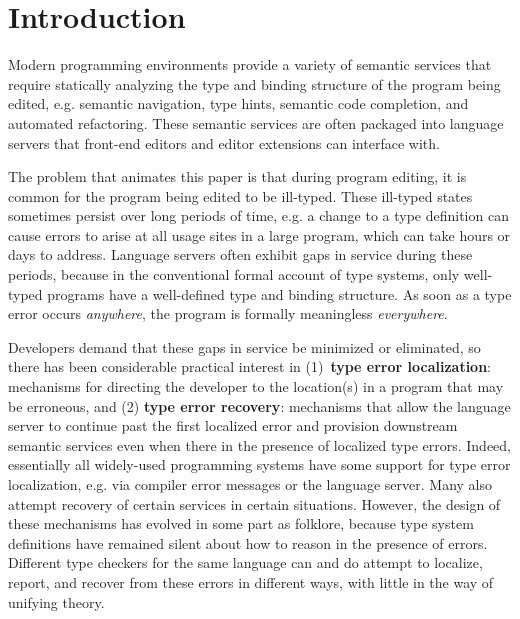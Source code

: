 \section{Introduction}
\label{sec:introduction}


Modern programming environments provide 
a variety of semantic services that require statically analyzing the type and binding structure of the program being edited, e.g. semantic navigation, type hints, semantic code completion, and automated refactoring. 
These semantic services are often packaged into language servers that front-end
editors and editor extensions can interface with.

The problem that animates this paper is that during program editing, 
it is common for the program being edited to be ill-typed. These ill-typed states sometimes persist over long periods of time, e.g. a change to a type definition can cause errors to arise at all usage sites in a large program, which can take hours or days to address. Language servers often exhibit gaps in service during these periods, because in the conventional formal account of type systems, only well-typed programs have a well-defined type and binding structure. As soon as a type error occurs \emph{anywhere}, the program is formally meaningless \emph{everywhere}.



Developers demand that these gaps in service be minimized or eliminated, so there has been considerable practical interest in (1)~\textbf{type error localization}: mechanisms for directing the developer to 
the location(s) in a program that may be erroneous, and (2) \textbf{type error recovery}: 
mechanisms that allow the language server to continue past the first localized error and provision downstream semantic services even when there in the presence of localized type errors.
Indeed, essentially all widely-used programming systems have some support for type error 
localization, e.g. via compiler error messages or the language server.
Many also attempt recovery of certain services in certain situations. 
However, the design of these mechanisms has evolved in some part as folklore, because type system definitions have remained silent about how to reason in the presence of errors. Different type checkers for the same language can and do attempt to localize, report, and recover from these errors in different ways, with little in the way of unifying theory. 

